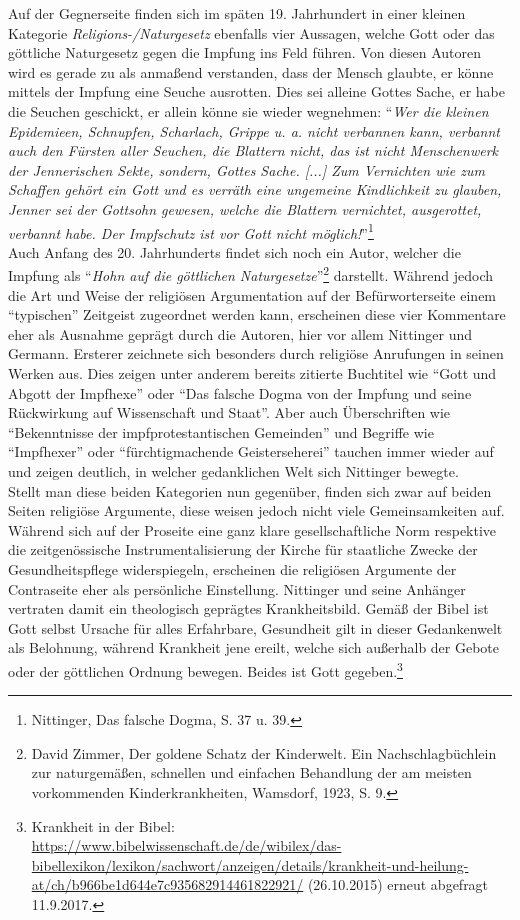 \documentclass[
    a4paper,
    12pt,
    hyphens,
    chapterprefix=true,
    headheight=33pt,
    footheight=29pt,
    headings=optiontohead, %
]{scrartcl}
\begin{document}
{Auf der Gegnerseite finden sich im späten 19. Jahrhundert in einer kleinen Kategorie \textit{Religions-/Naturgesetz} ebenfalls vier Aussagen, welche Gott oder das göttliche Naturgesetz gegen die Impfung ins Feld führen. Von diesen Autoren wird es gerade zu als anmaßend verstanden, dass der Mensch glaubte, er könne mittels der Impfung eine Seuche ausrotten. Dies sei alleine Gottes Sache, er habe die Seuchen geschickt, er allein könne sie wieder wegnehmen: "`\textit{Wer die kleinen Epidemieen, Schnupfen, Scharlach, Grippe u. a. nicht verbannen kann, verbannt auch den Fürsten aller Seuchen, die Blattern nicht, das ist nicht Menschenwerk der Jennerischen Sekte, sondern, Gottes Sache. [...] Zum Vernichten wie zum Schaffen gehört ein Gott und es verräth eine ungemeine Kindlichkeit zu glauben, Jenner sei der Gottsohn gewesen, welche die Blattern vernichtet, ausgerottet, verbannt habe. Der Impfschutz ist vor Gott nicht möglich!}"'\footnote{Nittinger, Das falsche Dogma, S. 37 u. 39.}\\
Auch Anfang des 20. Jahrhunderts findet sich noch ein Autor, welcher die Impfung als "`\textit{Hohn auf die göttlichen Naturgesetze}"'\footnote{David Zimmer, Der goldene Schatz der Kinderwelt. Ein Nachschlagbüchlein zur naturgemäßen, schnellen und einfachen Behandlung der am meisten vorkommenden Kinderkrankheiten, Wamsdorf, 1923, S. 9. } darstellt. Während jedoch die Art und Weise der religiösen Argumentation auf der Befürworterseite einem "`typischen"' Zeitgeist zugeordnet werden kann, erscheinen diese vier Kommentare eher als Ausnahme geprägt durch die Autoren, hier vor allem Nittinger und Germann. Ersterer zeichnete sich besonders durch religiöse Anrufungen in seinen Werken aus. Dies zeigen unter anderem bereits zitierte Buchtitel wie "`Gott und Abgott der Impfhexe"' oder "`Das falsche Dogma von der Impfung und seine Rückwirkung auf Wissenschaft und Staat"'. Aber auch Überschriften wie "`Bekenntnisse der impfprotestantischen Gemeinden"' und Begriffe wie "`Impfhexer"' oder "`fürchtigmachende Geisterseherei"' tauchen immer wieder auf und zeigen deutlich, in welcher gedanklichen Welt sich Nittinger bewegte.\\
Stellt man diese beiden Kategorien nun gegenüber, finden sich zwar auf beiden Seiten religiöse Argumente, diese weisen jedoch nicht viele Gemeinsamkeiten auf. Während sich auf der Proseite eine ganz klare gesellschaftliche Norm respektive die zeitgenössische Instrumentalisierung der Kirche für staatliche Zwecke der Gesundheitspflege widerspiegeln, erscheinen die religiösen Argumente der Contraseite eher als persönliche Einstellung. Nittinger und seine Anhänger vertraten damit ein theologisch geprägtes Krankheitsbild. Gemäß der Bibel ist Gott selbst Ursache für alles Erfahrbare, Gesundheit gilt in dieser Gedankenwelt als Belohnung, während Krankheit jene ereilt, welche sich außerhalb der Gebote oder der göttlichen Ordnung bewegen. Beides ist Gott gegeben.\footnote{Krankheit in der Bibel:\\ \url{https://www.bibelwissenschaft.de/de/wibilex/das-bibellexikon/lexikon/sachwort/anzeigen/details/krankheit-und-heilung-at/ch/b966be1d644e7c935682914461822921/} (26.10.2015) erneut abgefragt 11.9.2017.}
}
\end{document}
